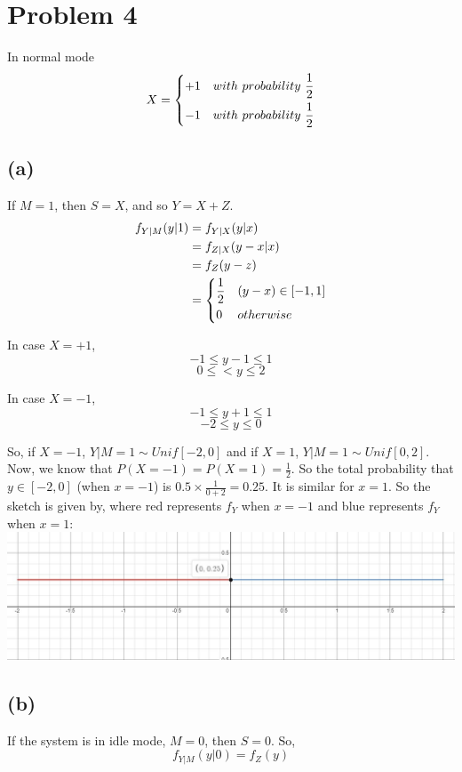 \documentclass{article}
\begin{document}
\section*{Problem 4}
In normal mode
	$$ X = \begin{dcases}
		+1 & with\ probability\ \frac{1}{2} \\
		-1 & with\ probability\ \frac{1}{2} \\
	\end{dcases}
	$$

\subsection*{(a)}
	If $M=1$, then $S=X$, and so $Y= X+Z$.
	$$ \begin{aligned}
		 f_{Y|M} (y|1) &= f_{Y|X}(y|x) \\
		&= f_{Z|X} (y-x|x) \\
		&= f_Z (y-z) \\
		&= \begin{dcases}
			\frac{1}{2} & (y-x) \in [-1,1] \\
			0 & otherwise \\
		\end{dcases}
	\end{aligned}
	$$

	In case $X=+1$,
	$$ -1\leq y-1 \leq 1$$
	$$ 0\leq <y \leq 2 $$

	In case $X=-1$,
	$$ -1 \leq y+1 \leq 1$$
	$$ -2 \leq y \leq 0 $$

	So, if $X=-1$, $Y|M=1 \sim Unif[-2,0]$ and if $X=1$, $Y|M=1 \sim Unif[0,2]$. \hfill \hfill \linebreak
	Now, we know that $P(X=-1)=P(X=1)= \frac{1}{2}$. So the total probability that $y\in[-2,0]$ (when $x=-1$) is $0.5 \times \frac{1}{0+2} = 0.25 $. It is similar for $x=1$. So the sketch is given by, where red represents $f_Y$ when $x=-1$ and blue represents $f_Y$ when $x=1$: \hfill \hfill \linebreak
	\includegraphics[width=\textwidth]{plot2}

\subsection*{(b)}
If the system is in idle mode, $M=0$, then $S=0$.
	So,
	$$ f_{Y|M} (y|0) = f_Z (y) $$
\end{document}

